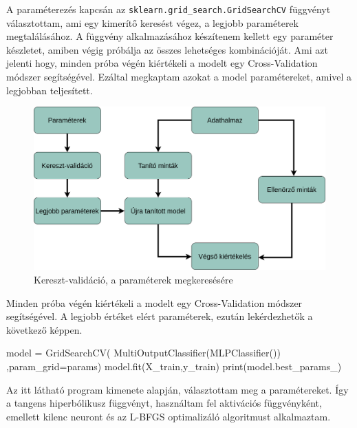 A paraméterezés kapcsán az \texttt{sklearn.grid\_search.GridSearchCV} függvényt választottam, ami egy kimerítő keresést végez, a legjobb paraméterek megtalálásához. A függvény alkalmazásához készítenem kellett egy paraméter készletet, amiben végig próbálja az összes lehetséges kombinációját. Ami azt jelenti hogy, minden próba végén kiértékeli a modelt egy Cross-Validation módszer segítségével. Ezáltal megkaptam azokat a model paramétereket, amivel a legjobban teljesített.
\begin{figure}[h!]
\centering
\includegraphics[scale=0.3]{images/gridSearch.png}
\caption{Kereszt-validáció, a paraméterek megkeresésére}
\label{fig:neuralnetwork}
\end{figure}

Minden próba végén kiértékeli a modelt egy Cross-Validation módszer segítségével. A legjobb értéket elért paraméterek, ezután lekérdezhetők a következő képpen.

\begin{python}
model = GridSearchCV( MultiOutputClassifier(MLPClassifier())
  ,param_grid=params)
model.fit(X_train,y_train)
print(model.best_params_)
\end{python} 

Az itt látható program kimenete alapján, választottam meg a paramétereket.
Így a tangens hiperbólikusz függvényt, használtam fel aktivációs függvényként, emellett kilenc neuront és az L-BFGS optimalizáló algoritmust alkalmaztam.


